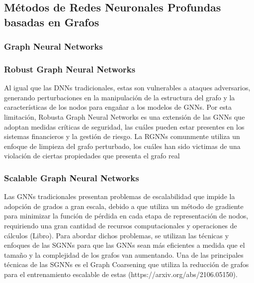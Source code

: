 \subsection{Métodos de Redes Neuronales Profundas basadas en Grafos}
\subsubsection{Graph Neural Networks}


\subsubsection{Robust Graph Neural Networks}
Al igual que las DNNs tradicionales, estas son vulnerables a ataques adversarios, generando perturbaciones en la manipulación de la estructura del grafo y la características de los nodos para engañar a los modelos de GNNs. Por esta limitación, Robusta Graph Neural Networks es una extensión de las GNNs que adoptan medidas críticas de seguridad, las cuáles pueden estar presentes en los sistemas financieros y la gestión de riesgo. La RGNNs comunmente utiliza un enfoque de limpieza del grafo perturbado, los cuáles han sido victimas de una violación de ciertas propiedades que presenta el grafo real 


\subsubsection{Scalable Graph Neural Networks}
Las GNNs tradicionales presentan problemas de escalabilidad que impide la adopción de grados a gran escala, debido a que utiliza un método de gradiente para minimizar la función de pérdida en cada etapa de representación de nodos, requiriendo una gran cantidad de recursos computacionales y operaciones de cálculos (Libro). Para abordar dichos problemas, se utilizan las técnicas y enfoques de las SGNNs para que las GNNs sean más eficientes a medida que el tamaño y la complejidad de los grafos van aumentando. Una de las principales técnicas de las SGNNs es el Graph Coarsening que utiliza la reducción de grafos para el entrenamiento escalable de estas (https://arxiv.org/abs/2106.05150).

